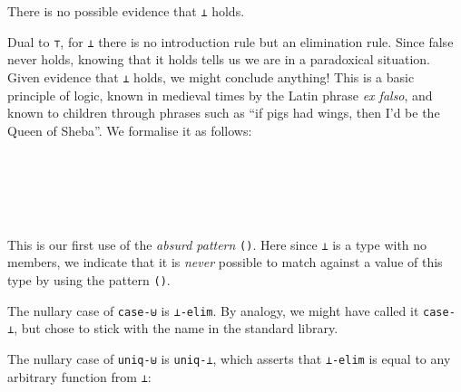 There is no possible evidence that \texttt{⊥} holds.

Dual to \texttt{⊤}, for \texttt{⊥} there is no introduction rule but an
elimination rule. Since false never holds, knowing that it holds tells
us we are in a paradoxical situation. Given evidence that \texttt{⊥}
holds, we might conclude anything! This is a basic principle of logic,
known in medieval times by the Latin phrase \emph{ex falso}, and known
to children through phrases such as ``if pigs had wings, then I'd be the
Queen of Sheba''. We formalise it as follows:

\begin{fence}
\begin{code}%
\>[0]\AgdaSpace{}%
\AgdaSymbol{:}\AgdaSpace{}%
\AgdaSpace{}%
\AgdaSymbol{\{}\AgdaSpace{}%
\AgdaSymbol{:}\AgdaSpace{}%
\AgdaSymbol{\}}\<%
\\
\>[0][@{}l@{\AgdaIndent{0}}]%
\>[2]%
\>[599I]\<%
\\
\>[.][@{}l@{}]\<[599I]%
\>[4]\AgdaComment{--}\<%
\\
%
\>[2]\AgdaSpace{}%
\<%
\\
\>[0]\AgdaSpace{}%
\AgdaSymbol{()}\<%
\end{code}
\end{fence}

This is our first use of the \emph{absurd pattern} \texttt{()}. Here
since \texttt{⊥} is a type with no members, we indicate that it is
\emph{never} possible to match against a value of this type by using the
pattern \texttt{()}.

The nullary case of \texttt{case-⊎} is \texttt{⊥-elim}. By analogy, we
might have called it \texttt{case-⊥}, but chose to stick with the name
in the standard library.

The nullary case of \texttt{uniq-⊎} is \texttt{uniq-⊥}, which asserts
that \texttt{⊥-elim} is equal to any arbitrary function from \texttt{⊥}:

\begin{fence}
\begin{code}%
\>[0]\AgdaSpace{}%
\AgdaSymbol{:}\AgdaSpace{}%
\AgdaSpace{}%
\AgdaSymbol{\{}\AgdaSpace{}%
\AgdaSymbol{:}\AgdaSpace{}%
\AgdaSymbol{\}}\AgdaSpace{}%
\AgdaSymbol{(}\AgdaSpace{}%
\AgdaSymbol{:}\AgdaSpace{}%
\AgdaSpace{}%
\AgdaSpace{}%
\AgdaSymbol{)}\AgdaSpace{}%
\AgdaSymbol{(}\AgdaSpace{}%
\AgdaSymbol{:}\AgdaSpace{}%
\AgdaSymbol{)}\AgdaSpace{}%
\AgdaSpace{}%
\AgdaSpace{}%
\AgdaSpace{}%
\AgdaSpace{}%
\AgdaSpace{}%
\<%
\\
\>[0]\AgdaSpace{}%
\AgdaSpace{}%
\AgdaSymbol{()}\<%
\end{code}
\end{fence}

